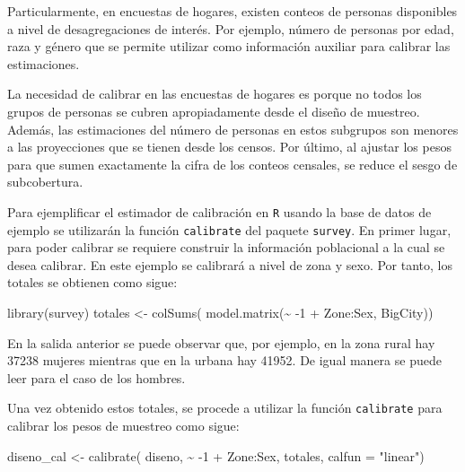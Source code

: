 \documentclass[
  12pt,
]{book}
\newenvironment{Shaded}{\begin{snugshade}}{\end{snugshade}}
\newcommand{\AttributeTok}[1]{\textcolor[rgb]{0.77,0.63,0.00}{#1}}
\newcommand{\DecValTok}[1]{\textcolor[rgb]{0.00,0.00,0.81}{#1}}
\newcommand{\FunctionTok}[1]{\textcolor[rgb]{0.00,0.00,0.00}{#1}}
\newcommand{\NormalTok}[1]{#1}
\newcommand{\OtherTok}[1]{\textcolor[rgb]{0.56,0.35,0.01}{#1}}
\newcommand{\SpecialCharTok}[1]{\textcolor[rgb]{0.00,0.00,0.00}{#1}}
\newcommand{\StringTok}[1]{\textcolor[rgb]{0.31,0.60,0.02}{#1}}
\begin{document}
Particularmente, en encuestas de hogares, existen conteos de personas disponibles a nivel de desagregaciones de interés. Por ejemplo, número de personas por edad, raza y género que se permite utilizar como información auxiliar para calibrar las estimaciones.

La necesidad de calibrar en las encuestas de hogares es porque no todos los grupos de personas se cubren apropiadamente desde el diseño de muestreo. Además, las estimaciones del número de personas en estos subgrupos son menores a las proyecciones que se tienen desde los censos. Por último, al ajustar los pesos para que sumen exactamente la cifra de los conteos censales, se reduce el sesgo de subcobertura.

Para ejemplificar el estimador de calibración en \texttt{R} usando la base de datos de ejemplo se utilizarán la función \texttt{calibrate} del paquete \texttt{survey}. En primer lugar, para poder calibrar se requiere construir la información poblacional a la cual se desea calibrar. En este ejemplo se calibrará a nivel de zona y sexo. Por tanto, los totales se obtienen como sigue:

\begin{Shaded}
\begin{Highlighting}[]
\FunctionTok{library}\NormalTok{(survey)}
\NormalTok{totales }\OtherTok{\textless{}{-}} \FunctionTok{colSums}\NormalTok{(}
  \FunctionTok{model.matrix}\NormalTok{(}\SpecialCharTok{\textasciitilde{}} \SpecialCharTok{{-}}\DecValTok{1} \SpecialCharTok{+}\NormalTok{ Zone}\SpecialCharTok{:}\NormalTok{Sex, BigCity)) }
\end{Highlighting}
\end{Shaded}

En la salida anterior se puede observar que, por ejemplo, en la zona rural hay 37238 mujeres mientras que en la urbana hay 41952. De igual manera se puede leer para el caso de los hombres.

Una vez obtenido estos totales, se procede a utilizar la función \texttt{calibrate} para calibrar los pesos de muestreo como sigue:

\begin{Shaded}
\begin{Highlighting}[]
\NormalTok{diseno\_cal }\OtherTok{\textless{}{-}} \FunctionTok{calibrate}\NormalTok{(}
\NormalTok{  diseno, }\SpecialCharTok{\textasciitilde{}} \SpecialCharTok{{-}}\DecValTok{1} \SpecialCharTok{+}\NormalTok{ Zone}\SpecialCharTok{:}\NormalTok{Sex, totales, }\AttributeTok{calfun =} \StringTok{"linear"}\NormalTok{)  }
\end{Highlighting}
\end{Shaded}
\end{document}
